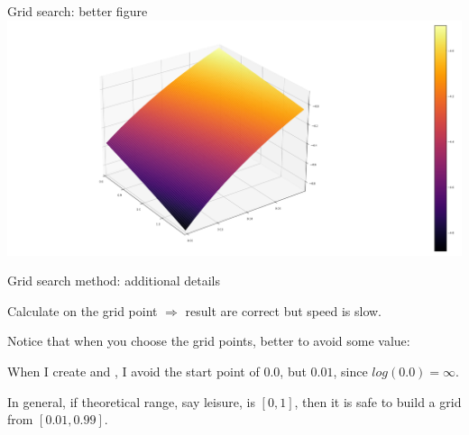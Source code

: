 \documentclass[11pt,aspectratio=43,usenames,dvipsnames]{beamer}
\theoremstyle{definition}
\begin{document}
\begin{frame}{Grid search: better figure}
\label{slide:grid_search__better_figure}
    \includegraphics[width=\textwidth]{./figures/utilitygov_better.png}
\end{frame}

\begin{frame}{Grid search method: additional details}
\label{slide:Grid_search_method__additional_details}

Calculate on the grid point $ \Rightarrow  $ result are correct but speed is slow.

Notice that when you choose the grid points, better to avoid some value:

\begin{example}
When I create  and , I avoid the start point of $ 0.0 $, but $ 0.01 $, since $ log(0.0) = \infty $.
\end{example}

In general, if theoretical range, say leisure, is $ [0, 1] $, then it is safe to build a grid from $ [0.01, 0.99] $.

\end{frame}




%
%
\end{document}
